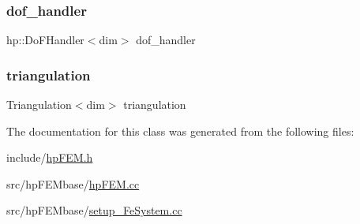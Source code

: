 \mbox{\label{classhp_f_e_m_ab4df20fb431f370878adc06e19280d62}} 
\subsubsection{\texorpdfstring{dof\_handler}{dof\_handler}}
{\footnotesize\ttfamily hp\+::\+Do\+F\+Handler$<$dim$>$ dof\+\_\+handler}

\mbox{\label{classhp_f_e_m_a1e604d1e68926caf1ebc67d2a7451783}} 
\subsubsection{\texorpdfstring{triangulation}{triangulation}}
{\footnotesize\ttfamily Triangulation$<$dim$>$ triangulation}



The documentation for this class was generated from the following files\+:\begin{DoxyCompactItemize}
\item 
include/\mbox{\hyperlink{hp_f_e_m_8h}{hp\+F\+E\+M.\+h}}\item 
src/hp\+F\+E\+Mbase/\mbox{\hyperlink{hp_f_e_m_8cc}{hp\+F\+E\+M.\+cc}}\item 
src/hp\+F\+E\+Mbase/\mbox{\hyperlink{setup___fe_system_8cc}{setup\+\_\+\+Fe\+System.\+cc}}\end{DoxyCompactItemize}
